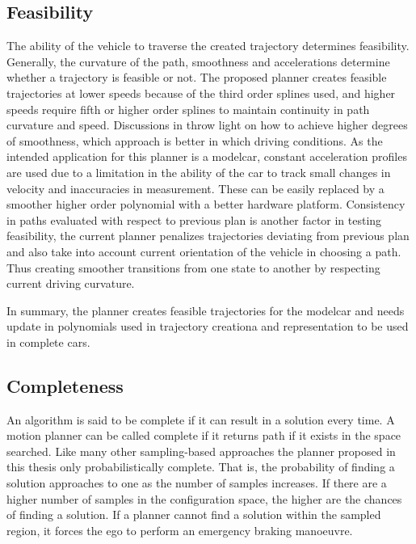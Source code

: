 \subsection{Feasibility}
\label{feasibility}
The ability of the vehicle to traverse the created trajectory determines feasibility. Generally, the curvature of the path, smoothness and accelerations determine whether a trajectory is feasible or not. The proposed planner creates feasible trajectories at lower speeds because of the third order splines used, and higher speeds require fifth or higher order splines to maintain continuity in path curvature and speed. Discussions in \cite{cmu_parallel_thesis} \cite{ppt_teqniqs_coll_Avdnce} throw light on how to achieve higher degrees of smoothness, which approach is better in which driving conditions. As the intended application for this planner is a modelcar, constant acceleration profiles are used due to a limitation in the ability of the car to track small changes in velocity and inaccuracies in measurement. These can be easily replaced by a smoother higher order polynomial with a better hardware platform. Consistency in paths evaluated with respect to previous plan is another factor in testing feasibility, the current planner penalizes trajectories deviating from previous plan and also take into account current orientation of the vehicle in choosing a path. Thus creating smoother transitions from one state to another by respecting current driving curvature.

In summary, the planner creates feasible trajectories for the modelcar and needs  update in polynomials used in trajectory creationa and representation to be used in complete cars. 

\subsection{Completeness}
\label{completeness}
An algorithm is said to be complete if it can result in a solution every time. A motion planner can be called complete if it returns path if it exists in the space searched. Like many other sampling-based approaches the planner proposed in this thesis only probabilistically complete. That is, the probability of finding a solution approaches to one as the number of samples increases. If there are a higher number of samples in the configuration space, the higher are the chances of finding a solution. If a planner cannot find a solution within the sampled region, it forces the ego to perform an emergency braking manoeuvre. 

